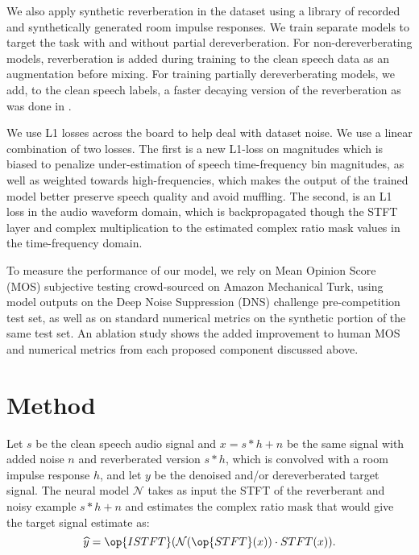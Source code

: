\documentclass[english]{article}
\begin{document}
We also apply synthetic reverberation in the dataset using a library of recorded and synthetically generated room impulse responses. We train separate models to target the task with and without partial dereverberation. 
For non-dereverberating models, reverberation is added during training to the clean speech data as an augmentation before mixing. For training partially dereverberating models, we add, to the clean speech labels, a faster decaying version of the reverberation as was done in \cite{zhao2018late}.

We use L1 losses across the board to help deal with dataset noise. We use a linear combination of two losses. The first is a new L1-loss on magnitudes which is biased to penalize under-estimation of speech time-frequency bin magnitudes, as well as weighted towards high-frequencies, which makes the output of the trained model better preserve speech quality and avoid muffling. The second, is an L1 loss in the audio waveform domain, which is backpropagated though the STFT layer and complex multiplication to the estimated complex ratio mask values in the time-frequency domain. 


To measure the performance of our model, we rely on Mean Opinion Score (MOS) subjective testing crowd-sourced on Amazon Mechanical Turk, using model outputs on the Deep Noise Suppression (DNS) challenge \cite{dnschallengefinal} pre-competition test set, as well as on standard numerical metrics on the synthetic portion of the same test set. An ablation study shows the added improvement to human MOS and numerical metrics from each proposed component discussed above. 

\section{Method}

Let $s$ be the clean speech audio signal and $x = s * h + n$ be the same signal with added noise $n$ and reverberated version $s * h$, which is convolved with a room impulse response $h$, and let $y$ be the denoised and/or dereverberated target signal. The neural model $\mathcal{N}$ takes as input the STFT of the reverberant and noisy example $s * h + n$ and estimates the complex ratio mask that would give the target signal estimate as: $$\widehat{y} = \op{ISTFT}(\mathcal{N}(\op{STFT}(x)) \cdot STFT(x)).$$ 
\end{document}
